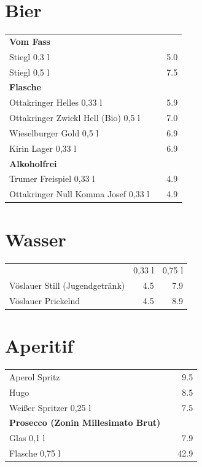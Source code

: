 \documentclass[a4paper,12pt]{article}
\begin{document}
\begin{multicols}{2}
\section*{Bier}
\begin{tabular}{Lrr}
\textbf{Vom Fass}\\
\hspace{0.4cm}Stiegl 0,3 l & & 5.0\\
\hspace{0.4cm}Stiegl 0,5 l & & 7.5\vspace{0.1cm}\\
\textbf{Flasche}\\
\hspace{0.4cm}Ottakringer Helles 0,33 l & & 5.9\\
\hspace{0.4cm}Ottakringer Zwickl Hell (Bio) 0,5 l & & 7.0\\
\hspace{0.4cm}Wieselburger Gold 0,5 l & & 6.9\\
\hspace{0.4cm}Kirin Lager 0,33 l & & 6.9\vspace{0.1cm}\\
\textbf{Alkoholfrei}\\
\hspace{0.4cm}Trumer Freispiel 0,33 l & & 4.9\\
\hspace{0.4cm}Ottakringer Null Komma Josef 0,33 l & & 4.9
\end{tabular}

\columnbreak
\section*{Wasser}
\begin{tabular}{Lrr}
& 0,33 l & 0,75 l\\
Vöslauer Still (Jugendgetränk) & 4.5 & 7.9\\
Vöslauer Prickelnd & 4.5 & 8.9
\end{tabular}

\section*{Aperitif}
\begin{tabular}{Lrr}
Aperol Spritz & & 9.5\\
Hugo & & 8.5\\
Weißer Spritzer 0,25 l & & 7.5\\
\textbf{Prosecco (Zonin Millesimato Brut)}\\
\hspace{0.4cm}Glas 0,1 l & & 7.9\\
\hspace{0.4cm}Flasche 0,75 l & & 42.9
\end{tabular}


\end{multicols}
\end{document}
